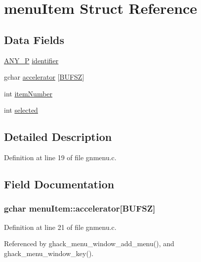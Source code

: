 \hypertarget{structmenuItem}{\section{menu\+Item Struct Reference}
\label{structmenuItem}
}
\subsection*{Data Fields}
\begin{DoxyCompactItemize}
\item 
\hyperlink{wintype_8h_ae29f750de92b8a7c2566957e5863fbed}{A\+N\+Y\+\_\+\+P} \hyperlink{structmenuItem_a51df9eca851d9d5801f6e7a8088016d6}{identifier}
\item 
gchar \hyperlink{structmenuItem_af83f532960744d4bad0e9ae62e03c896}{accelerator} \mbox{[}\hyperlink{wingem1_8c_ab26c26cbf7a0c97d8960c3cfb413f882}{B\+U\+F\+S\+Z}\mbox{]}
\item 
int \hyperlink{structmenuItem_a110b1866aeaf1a16e0cd29e1088333a8}{item\+Number}
\item 
int \hyperlink{structmenuItem_a96b0d07f0e7ee05c3e1824c0a3665ddb}{selected}
\end{DoxyCompactItemize}


\subsection{Detailed Description}


Definition at line 19 of file gnmenu.\+c.



\subsection{Field Documentation}
\hypertarget{structmenuItem_af83f532960744d4bad0e9ae62e03c896}{
\subsubsection[{accelerator}]{\setlength{\rightskip}{0pt plus 5cm}gchar menu\+Item\+::accelerator\mbox{[}{\bf B\+U\+F\+S\+Z}\mbox{]}}}\label{structmenuItem_af83f532960744d4bad0e9ae62e03c896}


Definition at line 21 of file gnmenu.\+c.



Referenced by ghack\+\_\+menu\+\_\+window\+\_\+add\+\_\+menu(), and ghack\+\_\+menu\+\_\+window\+\_\+key().

